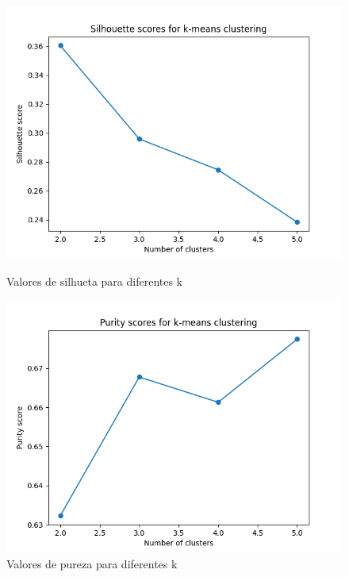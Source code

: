 \documentclass[a4paper,12pt]{article} %
\begin{document}
\begin{enumerate}
\begin{figure}[H]
    \begin{minipage}{.5\textwidth}
      \centering
      \includegraphics[width=\linewidth]{ex1_silhouette.png}
      \captionsetup{font=small} 
      \caption{Valores de silhueta para diferentes  k}
    \end{minipage}%
    \begin{minipage}{.5\textwidth}
      \centering
      \includegraphics[width=\linewidth]{ex1_purity.png}
      \captionsetup{font=small} 
      \caption{Valores de pureza para diferentes k}
    \end{minipage}
    \end{figure}


\end{enumerate}
\end{document}
